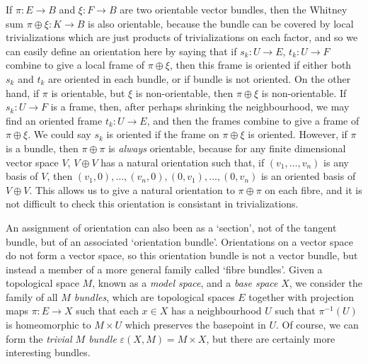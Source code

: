 \begin{example}
    If $\pi: E \to B$ and $\xi: F \to B$ are two orientable vector bundles, then the Whitney sum $\pi \oplus \xi: K \to B$ is also orientable, because the bundle can be covered by local trivializations which are just products of trivializations on each factor, and so we can easily define an orientation here by saying that if $s_k: U \to E$, $t_k: U \to F$ combine to give a local frame of $\pi \oplus \xi$, then this frame is oriented if either both $s_k$ and $t_k$ are oriented in each bundle, or if bundle is not oriented. On the other hand, if $\pi$ is orientable, but $\xi$ is non-orientable, then $\pi \oplus \xi$ is non-orientable. If $s_k: U \to F$ is a frame, then, after perhaps shrinking the neighbourhood, we may find an oriented frame $t_k: U \to E$, and then the frames combine to give a frame of $\pi \oplus \xi$. We could say $s_k$ is oriented if the frame on $\pi \oplus \xi$ is oriented. However, if $\pi$ is a bundle, then $\pi \oplus \pi$ is {\it always} orientable, because for any finite dimensional vector space $V$, $V \oplus V$ has a natural orientation such that, if $(v_1, \dots, v_n)$ is any basis of $V$, then $(v_1,0), \dots, (v_n,0), (0,v_1), \dots, (0,v_n)$ is an oriented basis of $V \oplus V$. This allows us to give a natural orientation to $\pi \oplus \pi$ on each fibre, and it is not difficult to check this orientation is consistant in trivializations.
\end{example}

An assignment of orientation can also been as a `section', not of the tangent bundle, but of an associated `orientation bundle'. Orientations on a vector space do not form a vector space, so this orientation bundle is not a vector bundle, but instead a member of a more general family called `fibre bundles'. Given a topological space $M$, known as a \emph{model space}, and a \emph{base space} $X$, we consider the family of all \emph{$M$ bundles}, which are topological spaces $E$ together with projection maps $\pi: E \to X$ such that each $x \in X$ has a neighbourhood $U$ such that $\pi^{-1}(U)$ is homeomorphic to $M \times U$ which preserves the basepoint in $U$. Of course, we can form the \emph{trivial $M$ bundle} $\varepsilon(X,M) = M \times X$, but there are certainly more interesting bundles.

